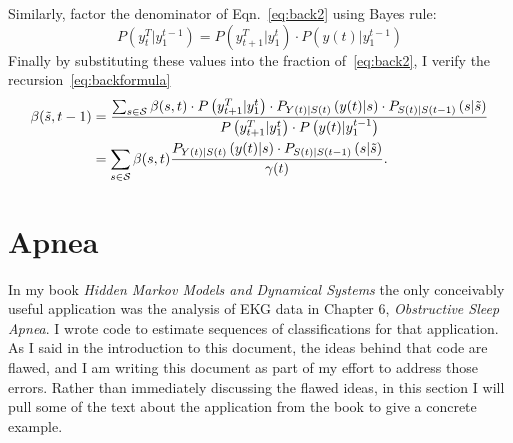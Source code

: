 \documentclass[]{article}
\newcommand{\ts}[3]{#1_{#2}^{#3}}                    %
\newcommand{\ti}[2]{{#1}{(#2)}}                  %
\newcommand{\states}{{\cal{S}}}
\begin{document}
Similarly, factor the denominator of Eqn.~\eqref{eq:back2} using
Bayes rule:
\begin{equation*}
  P \left(\ts{y}{t}{T}|\ts{y}{1}{t-1} \right) = P
  \left(\ts{y}{t+1}{T}|\ts{y}{1}{t}  \right) \cdot {P \left(
  \ti{y}{t}|\ts{y}{1}{t-1}\right)}
\end{equation*}
Finally by substituting these values into the fraction
of~\eqref{eq:back2}, I verify the recursion~\eqref{eq:backformula}
\begin{align}
  \label{eq:back3} \beta({\tilde s},t-1) &= \frac{\sum_{s\in\states}
    \beta(s,t) \cdot P \left(\ts{y}{t+1}{T}|\ts{y}{1}{t} \right)
    \cdot P_{\ti{Y}{t}|\ti{S}{t}} \left(\ti{y}{t}|s \right) \cdot
    P_{\ti{S}{t}|\ti{S}{t-1}} \left(s|{\tilde s} \right)} {P
    \left(\ts{y}{t+1}{T}|\ts{y}{1}{t} \right) \cdot {P \left(
        \ti{y}{t}|\ts{y}{1}{t-1}\right)}} \\
  \label{eq:back4} &= \sum_{s\in\states} \beta(s,t) \frac{
    P_{\ti{Y}{t}|\ti{S}{t}} \left(\ti{y}{t}|s \right) \cdot
    P_{\ti{S}{t}|\ti{S}{t-1}} \left(s|{\tilde s} \right)} {\ti{\gamma}{t}}.
\end{align}

\section{Apnea}\label{sec:Apnea}

In my book \emph{Hidden Markov Models and Dynamical Systems} the only
conceivably useful application was the analysis of EKG data in Chapter
6, \emph{Obstructive Sleep Apnea}.  I wrote code to estimate sequences
of classifications for that application.  As I said in the
introduction to this document, the ideas behind that code are flawed,
and I am writing this document as part of my effort to address those
errors.  Rather than immediately discussing the flawed ideas, in this
section I will pull some of the text about the application from the
book to give a concrete example.
\end{document}
